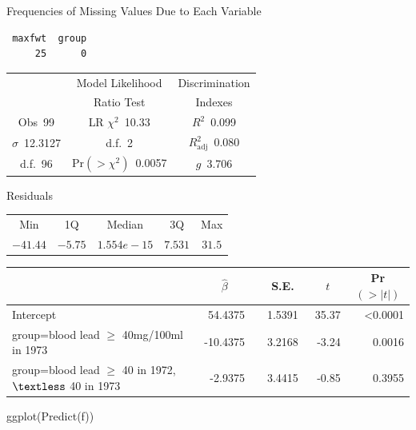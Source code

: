  \begin{center}
 Frequencies of Missing Values Due to Each Variable
 
 \smallskip
 
 \begin{verbatim}
 maxfwt  group 
     25      0 
 \end{verbatim}
 
 \end{center}
 {\selectfont \begin{center}\begin{tabular}{|c|c|c|}\hline
&Model Likelihood&Discrimination\\
&Ratio Test&Indexes\\\hline
Obs~\hfill 99&LR $\chi^{2}$~\hfill 10.33&$R^{2}$~\hfill 0.099\\
$\sigma$~\hfill 12.3127&d.f.~\hfill 2&$R^{2}_{\textrm{adj}}$~\hfill 0.080\\
d.f.~\hfill 96&Pr$(>\chi^{2})$~\hfill 0.0057&$g$~\hfill 3.706\\
\hline
\end{tabular}
\end{center}}
 \begin{center}
 Residuals
 

 \begin{tabular}{ccccc}
Min&1Q&Median&3Q&Max\\
$-41.44$&$-5.75$&$1.554e-15$&$7.531$&$31.5$\\
\end{tabular}
 \end{center}
 
 \setlongtables\begin{longtable}{lrrrr}\hline
 \multicolumn{1}{l}{}&\multicolumn{1}{c}{$\hat{\beta}$}&\multicolumn{1}{c}{S.E.}&\multicolumn{1}{c}{$t$}&\multicolumn{1}{c}{Pr$(>|t|)$}\tabularnewline
 \hline
 \endhead
 \hline
 \endfoot
 Intercept&~ 54.4375~&~1.5391~&35.37&\textless 0.0001\tabularnewline
 group=blood lead $\geq$ 40mg/100ml in 1973&~-10.4375~&~3.2168~&-3.24&0.0016\tabularnewline
 group=blood lead $\geq$ 40 in 1972, $\textless $ 40 in 1973&~ -2.9375~&~3.4415~&-0.85&0.3955\tabularnewline
 \hline
 \end{longtable}
 \addtocounter{table}{-1}
\begin{Sinput}
ggplot(Predict(f))
\end{Sinput}


